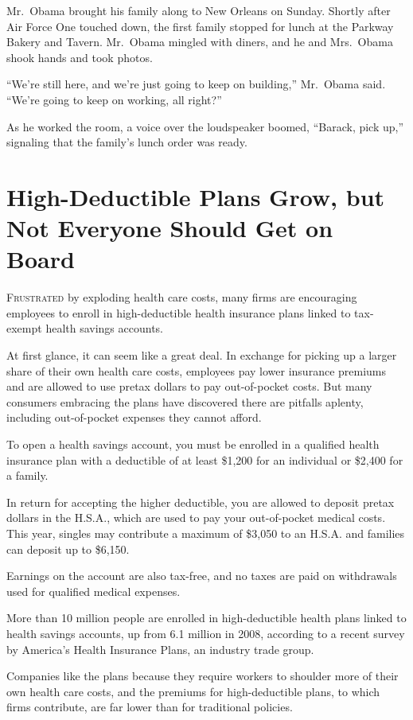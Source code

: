 ﻿\documentclass[12pt]{article}
\begin{document}
Mr.~Obama brought his family along to New Orleans on Sunday. Shortly after Air Force One touched
down, the first family stopped for lunch at the Parkway Bakery and Tavern. Mr.~Obama mingled with
diners, and he and Mrs.~Obama shook hands and took photos.

``We're still here, and we're just going to keep on building,'' Mr.~Obama said. ``We're going to
keep on working, all right?''

As he worked the room, a voice over the loudspeaker boomed, ``Barack, pick up,'' signaling that the
family's lunch order was ready.

\pagebreak
\section{High-Deductible Plans Grow, but Not Everyone Should Get on Board}

\lettrine{F}{rustrated} by exploding health care costs, many firms are
encouraging employees to enroll in high-deductible health insurance plans linked to tax-exempt
health savings accounts.

At first glance, it can seem like a great deal. In exchange for picking up a larger share of their
own health care costs, employees pay lower insurance premiums and are allowed to use pretax dollars
to pay out-of-pocket costs. But many consumers embracing the plans have discovered there are
pitfalls aplenty, including out-of-pocket expenses they cannot afford.

To open a health savings account, you must be enrolled in a qualified health insurance plan with a
deductible of at least \$1,200 for an individual or \$2,400 for a family.

In return for accepting the higher deductible, you are allowed to deposit pretax dollars in the
H.S.A., which are used to pay your out-of-pocket medical costs. This year, singles may contribute a
maximum of \$3,050 to an H.S.A. and families can deposit up to \$6,150.

Earnings on the account are also tax-free, and no taxes are paid on withdrawals used for qualified
medical expenses.

More than 10 million people are enrolled in high-deductible health plans linked to health savings
accounts, up from 6.1 million in 2008, according to a recent survey by America's Health Insurance
Plans, an industry trade group.

Companies like the plans because they require workers to shoulder more of their own health care
costs, and the premiums for high-deductible plans, to which firms contribute, are far lower than for
traditional policies.
\end{document}
